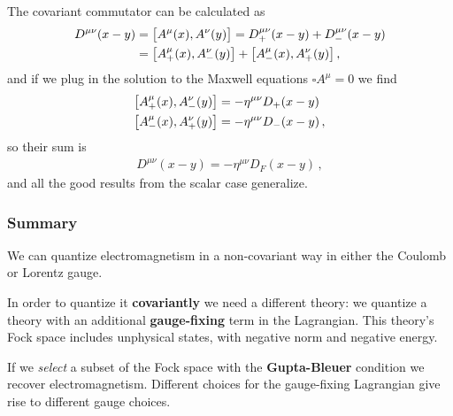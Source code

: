 \documentclass[main.tex]{subfiles}
\begin{document}
The covariant commutator can be calculated as 
%
\begin{align}
D^{\mu \nu } (x-y) &= \qty[A^{\mu  }(x), A^{\nu }(y)]  = D^{\mu \nu }_{+}(x-y) + D^{\mu \nu }_{-} (x-y)  \\
&= \qty[A^{\mu }_{+} (x), A^{\nu }_{-}(y)]
+ \qty[A^{\mu }_{-} (x), A^{\nu }_{+}(y)]
\,,
\end{align}
%
and if we plug in the solution to the Maxwell equations \(\square A^{\mu } = 0\) we find 
%
\begin{align}
\qty[A^{\mu }_{+} (x), A^{\nu }_{-}(y)] &= - \eta^{\mu \nu } D_{+}(x-y) \\
\qty[A^{\mu }_{-} (x), A^{\nu }_{+}(y)] &= - \eta^{\mu \nu } D_{-}(x-y)
\,,
\end{align}
%
so their sum is 
%
\begin{align}
D^{\mu \nu } (x-y) = - \eta^{\mu \nu } D_F(x-y)
\,,
\end{align}
%
and all the good results from the scalar case generalize. 

\subsubsection{Summary}

We can quantize electromagnetism in a non-covariant way in either the Coulomb or Lorentz gauge. 

In order to quantize it \textbf{covariantly} we need a different theory: we quantize a theory with an additional \textbf{gauge-fixing} term in the Lagrangian. 
This theory's Fock space includes unphysical states, with negative norm and negative energy. 

If we \emph{select} a subset of the Fock space with the \textbf{Gupta-Bleuer} condition we recover electromagnetism. 
Different choices for the gauge-fixing Lagrangian give rise to different gauge choices. 
\end{document}
